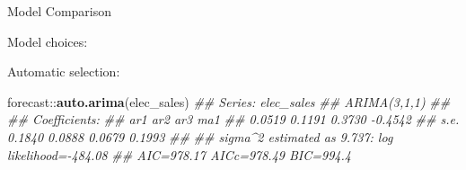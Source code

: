 \documentclass[11pt,ignorenonframetext,]{beamer}
\newenvironment{Shaded}{}{}
\newcommand{\CommentTok}[1]{\textcolor[rgb]{0.38,0.63,0.69}{\textit{#1}}}
\newcommand{\DataTypeTok}[1]{\textcolor[rgb]{0.56,0.13,0.00}{#1}}
\newcommand{\DecValTok}[1]{\textcolor[rgb]{0.25,0.63,0.44}{#1}}
\newcommand{\KeywordTok}[1]{\textcolor[rgb]{0.00,0.44,0.13}{\textbf{#1}}}
\newcommand{\NormalTok}[1]{#1}
\newcommand{\OperatorTok}[1]{\textcolor[rgb]{0.40,0.40,0.40}{#1}}
\let\oldShaded\Shaded
\let\endoldShaded\endShaded
\renewenvironment{Shaded}{\footnotesize\begin{spacing}{0.9}\oldShaded}{\endoldShaded\end{spacing}}
\let\oldverbatim\verbatim
\let\endoldverbatim\endverbatim
\newcommand{\scriptoutput}{
  \renewenvironment{Shaded}{\scriptsize\begin{spacing}{0.9}\oldShaded}{\endoldShaded\end{spacing}}
  \renewenvironment{verbatim}{\scriptsize\begin{spacing}{0.9}\oldverbatim}{\endoldverbatim\end{spacing}}
}
\begin{document}
\begin{frame}[fragile]{Model Comparison}
\protect\hypertarget{model-comparison}{}

\scriptoutput

Model choices:

\begin{Shaded}
\end{Shaded}

Automatic selection:

\begin{Shaded}
\begin{Highlighting}[]
\NormalTok{forecast}\OperatorTok{::}\KeywordTok{auto.arima}\NormalTok{(elec_sales)}
\CommentTok{## Series: elec_sales }
\CommentTok{## ARIMA(3,1,1) }
\CommentTok{## }
\CommentTok{## Coefficients:}
\CommentTok{##          ar1     ar2     ar3      ma1}
\CommentTok{##       0.0519  0.1191  0.3730  -0.4542}
\CommentTok{## s.e.  0.1840  0.0888  0.0679   0.1993}
\CommentTok{## }
\CommentTok{## sigma^2 estimated as 9.737:  log likelihood=-484.08}
\CommentTok{## AIC=978.17   AICc=978.49   BIC=994.4}
\end{Highlighting}
\end{Shaded}

\end{frame}
\end{document}
